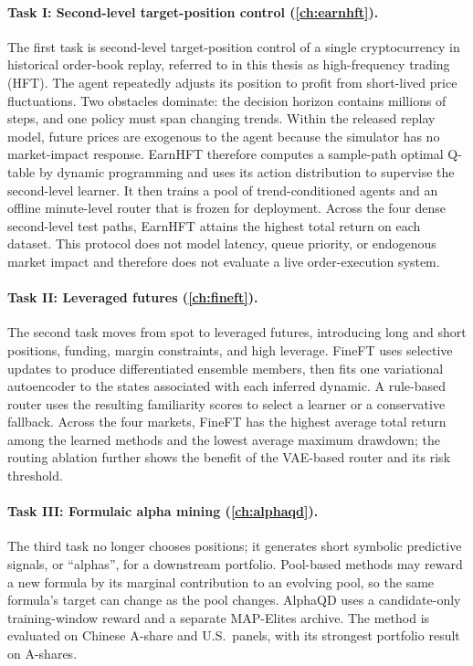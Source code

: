 \paragraph{Task I: Second-level target-position control (\cref{ch:earnhft}).} The first task is second-level target-position control of a single cryptocurrency in historical order-book replay, referred to in this thesis as high-frequency trading (HFT). The agent repeatedly adjusts its position to profit from short-lived price fluctuations. Two obstacles dominate: the decision horizon contains millions of steps, and one policy must span changing trends. Within the released replay model, future prices are exogenous to the agent because the simulator has no market-impact response. EarnHFT therefore computes a sample-path optimal Q-table by dynamic programming and uses its action distribution to supervise the second-level learner. It then trains a pool of trend-conditioned agents and an offline minute-level router that is frozen for deployment. Across the four dense second-level test paths, EarnHFT attains the highest total return on each dataset. This protocol does not model latency, queue priority, or endogenous market impact and therefore does not evaluate a live order-execution system.

\paragraph{Task II: Leveraged futures (\cref{ch:fineft}).} The second task moves from spot to leveraged futures, introducing long and short positions, funding, margin constraints, and high leverage. FineFT uses selective updates to produce differentiated ensemble members, then fits one variational autoencoder to the states associated with each inferred dynamic. A rule-based router uses the resulting familiarity scores to select a learner or a conservative fallback. Across the four markets, FineFT has the highest average total return among the learned methods and the lowest average maximum drawdown; the routing ablation further shows the benefit of the VAE-based router and its risk threshold.

\paragraph{Task III: Formulaic alpha mining (\cref{ch:alphaqd}).} The third task no longer chooses positions; it generates short symbolic predictive signals, or ``alphas'', for a downstream portfolio. Pool-based methods may reward a new formula by its marginal contribution to an evolving pool, so the same formula's target can change as the pool changes. AlphaQD uses a candidate-only training-window reward and a separate MAP-Elites archive. The method is evaluated on Chinese A-share and U.S.\ panels, with its strongest portfolio result on A-shares.

